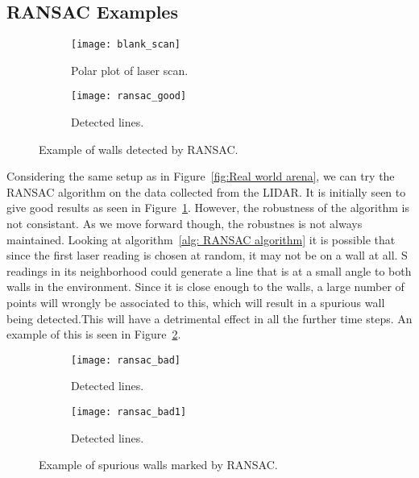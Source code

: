 \subsection{RANSAC Examples}
 \begin{figure}[h!]
     \centering
     \begin{subfigure}[b]{0.45\textwidth}
     
 	    \texttt{[image: blank\_scan]}
         \caption{Polar plot of laser scan.}
     \end{subfigure}
     \quad %
     \begin{subfigure}[b]{0.45\textwidth}
         \texttt{[image: ransac\_good]}
		 \caption{Detected lines.}
     \end{subfigure}%
         \caption{Example of walls detected by RANSAC.}
         \label{fig: ransac_good}
 \end{figure}
 Considering the same setup as in Figure~\ref{fig:Real world arena}, we can try the RANSAC algorithm on the data collected from the LIDAR. It is initially seen to give good results as seen in Figure~\ref{fig: ransac_good}. However, the robustness of the algorithm is not consistant. As we move forward though, the robustnes is not always maintained. Looking at algorithm~\ref{alg: RANSAC algorithm} it is possible that since the first laser reading is chosen at random, it may not be on a wall at all. S readings in its neighborhood could generate a line that is at a small angle to both walls in the environment. Since it is close enough to the walls, a large number of points will wrongly be associated to this, which will result in a spurious wall being detected.This will have a detrimental effect in all the further time steps. An example of this is seen in Figure~\ref{fig: ransac_bad}.
 \begin{figure}[h!]
     \centering
     \begin{subfigure}[b]{0.45\textwidth}
     
 	    \texttt{[image: ransac\_bad]}
        \caption{Detected lines.}
     \end{subfigure}
     \quad %
     \begin{subfigure}[b]{0.45\textwidth}
         \texttt{[image: ransac\_bad1]}
		 \caption{Detected lines.}
     \end{subfigure}%
         \caption{Example of spurious walls marked by RANSAC.}
         \label{fig: ransac_bad}
 \end{figure}
